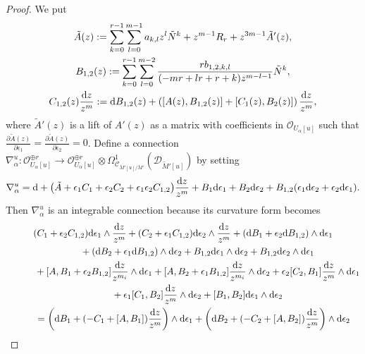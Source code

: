 \documentclass[pdftex]{sigma}
\numberwithin{equation}{section}
\begin{document}
\begin{proof}
We put
\begin{gather*}
 \tilde{A}(z)
 :=
 \sum_{k=0}^{r-1} \sum_{l=0}^{m-1} a_{k,l} z^l \tilde{N}^k
 + z^{m-1}R_r+z^{3m-1}\tilde{A}'(z),
 \\
 B_{1,2}(z)
 :=
 \sum_{k=0}^{r-1} \sum_{l=0}^{m-2}
 \frac {rb_{1,2,k,l}} {(-mr+lr+r+k)z^{m-l-1}} \tilde{N}^k,
 \\
 C_{1,2}(z)\frac{{\rm d}z} {z^m}
:=
 {\rm d}B_{1,2}(z)+\left([A(z),B_{1,2}(z)]+[C_1(z),B_2(z)]\right)\frac{{\rm d}z} {z^m},
\end{gather*}
where
$\tilde{A}'(z)$ is a lift of $A'(z)$
as a matrix with coefficients in
${\mathcal O}_{U_{\alpha}[u]}$
such that
$\frac {\partial \tilde{A}(z)} {\partial \epsilon_1}=
\frac {\partial \tilde{A}(z)} {\partial \epsilon_2}=0$.
Define a connection
$\nabla^u_{\alpha} \colon
{\mathcal O}_{U_{\alpha}[u]}^{\oplus r}
\longrightarrow
{\mathcal O}_{U_{\alpha}[u]}^{\oplus r}\otimes
\Omega^1_{{\mathcal C}_{\tilde{M}'[u]/\tilde{M}'}}({\mathcal D}_{\tilde{M}'[u]})$
by setting
\[
 \nabla^u_{\alpha}
 =
{\rm d}+
 \big(\tilde{A}+\epsilon_1C_1+\epsilon_2C_2+\epsilon_1\epsilon_2 C_{1,2}\big)\frac{{\rm d}z} {z^m}
 +B_1{\rm d}\epsilon_1+B_2{\rm d}\epsilon_2+B_{1,2}(\epsilon_1{\rm d}\epsilon_2+\epsilon_2{\rm d}\epsilon_1).
\]
Then $\nabla^u_{\alpha}$ is an integrable connection
because its curvature form becomes
\begin{gather*}
( C_1+\epsilon_2 C_{1,2} ) {\rm d}\epsilon_1\wedge \frac {{\rm d}z} {z^m}
 +
 ( C_2+\epsilon_1C_{1,2} ) {\rm d}\epsilon_2\wedge \frac {{\rm d}z} {z^m}
 +( {\rm d}B_1+\epsilon_2 {\rm d}B_{1,2} ) \wedge {\rm d}\epsilon_1
 \\
 \qquad\quad{}+
 ( {\rm d}B_2+\epsilon_1{\rm d}B_{1,2} ) \wedge {\rm d}\epsilon_2
 +
 B_{1,2}{\rm d}\epsilon_1\wedge {\rm d}\epsilon_2+B_{1,2}{\rm d}\epsilon_2\wedge {\rm d}\epsilon_1\\
 \qquad\quad{}
 +
 [A,B_1+\epsilon_2 B_{1,2}]
 \frac{{\rm d}z} {z^{m_i}} \wedge {\rm d}\epsilon_1
+[A,B_2+\epsilon_1 B_{1,2}]
 \frac{{\rm d}z} {z^{m_i}} \wedge {\rm d}\epsilon_2
 +\epsilon_2 [C_2,B_1]\frac{{\rm d}z} {z^m} \wedge {\rm d}\epsilon_1\\
 \qquad\quad{}
 +\epsilon_1[C_1,B_2]\frac{{\rm d}z} {z^m} \wedge {\rm d}\epsilon_2
 +[B_1,B_2]{\rm d}\epsilon_1 \wedge {\rm d}\epsilon_2
 \\
 \qquad{} =
 \left( {\rm d}B_1+(-C_1+[A,B_1])\frac{{\rm d}z} {z^m} \right)\wedge {\rm d}\epsilon_1
 +
 \left( {\rm d}B_2+(-C_2+[A,B_2])\frac{{\rm d}z} {z^m} \right)\wedge {\rm d}\epsilon_2
 \\

\end{gather*}
\end{proof}
\end{document}
